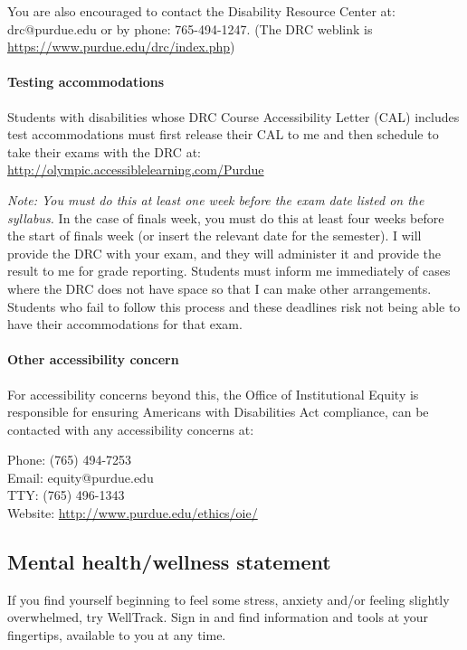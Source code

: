 \documentclass[letterpaper,11pt]{article}
\begin{document}
You are also encouraged to contact the Disability Resource Center at:
drc@purdue.edu or by phone: 765-494-1247. (The DRC weblink is
\url{https://www.purdue.edu/drc/index.php})

\paragraph{Testing accommodations}

Students with disabilities whose DRC Course Accessibility Letter (CAL)
includes test accommodations must first release their CAL to me and
then schedule to take
their exams with the DRC at:\\
\url{http://olympic.accessiblelearning.com/Purdue}

\emph{Note: You must do this at least one week before the exam date
  listed on the syllabus.} In the case of finals week, you must do
this at least four weeks before the start of finals week (or insert
the relevant date for the semester). I will provide the DRC with your
exam, and they will administer it and provide the result to me for
grade reporting. Students must inform me immediately of cases where
the DRC does not have space so that I can make other
arrangements. Students who fail to follow this process and these
deadlines risk not being able to have their accommodations for that
exam.

\paragraph{Other accessibility concern}

For accessibility concerns beyond this, the Office of Institutional
Equity is responsible for ensuring Americans with Disabilities Act
compliance, can be contacted with any accessibility concerns at:

Phone: (765) 494-7253\\
Email: equity@purdue.edu\\
TTY: (765) 496-1343\\
Website: \url{http://www.purdue.edu/ethics/oie/}

\subsection*{Mental health/wellness statement}

If you find yourself beginning to feel some stress, anxiety and/or feeling
slightly overwhelmed, try WellTrack. Sign in and find information and tools at
your fingertips, available to you at any time.
\end{document}
